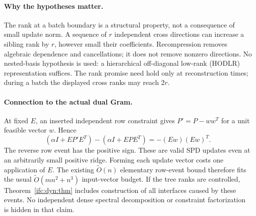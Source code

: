 \documentclass[11pt]{amsart}
\theoremstyle{definition}\newtheorem{definition}[theorem]{Definition}
\theoremstyle{remark}\newtheorem{remark}[theorem]{Remark}
\numberwithin{equation}{section}
\begin{document}
\paragraph{Why the hypotheses matter.}
The rank at a batch boundary is a structural property, not a consequence
of small update norm.  A sequence of $r$ independent cross directions can
increase a sibling rank by $r$, however small their coefficients.
Recompression removes algebraic dependence and cancellations; it does
not remove nonzero directions.  No nested-basis hypothesis is used:
a hierarchical off-diagonal low-rank (HODLR) representation suffices.  The rank promise need
hold only at reconstruction times; during a batch the displayed
cross ranks may reach $2r$.

\paragraph{Connection to the actual dual Gram.}
At fixed $E$, an inserted independent row constraint gives
$P'=P-ww^T$ for a unit feasible vector $w$.  Hence
\[
 (\alpha I+EP'E^T)-(\alpha I+EPE^T)=-(Ew)(Ew)^T.
\]
The reverse row event has the positive sign.  These are valid SPD
updates even at an arbitrarily small positive ridge.  Forming each
update vector costs one application of $E$.  The existing
$\widetilde O(n)$ elementary row-event bound therefore fits the usual
$\widetilde O(mn^2+n^3)$ input-vector budget.  If the tree ranks are
controlled, Theorem~\ref{ifc:dyn:thm} includes construction of all interfaces
caused by these events.  No independent dense spectral decomposition
or constraint factorization is hidden in that claim.
\end{document}

